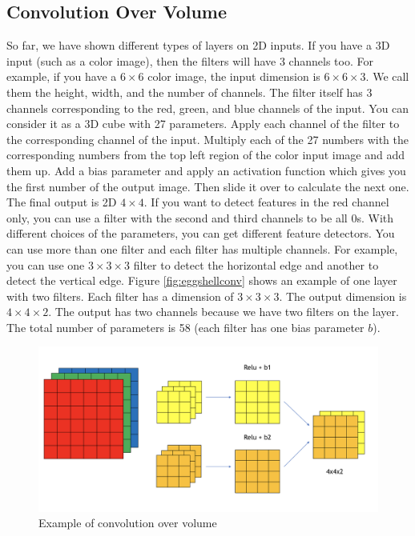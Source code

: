 \documentclass[12pt,]{krantz}
\begin{document}
\hypertarget{convolution-over-volume}{%
\subsection{Convolution Over Volume}\label{convolution-over-volume}}

So far, we have shown different types of layers on 2D inputs. If you have a 3D input (such as a color image), then the filters will have 3 channels too. For example, if you have a \(6 \times 6\) color image, the input dimension is \(6 \times 6 \times 3\). We call them the height, width, and the number of channels. The filter itself has 3 channels corresponding to the red, green, and blue channels of the input. You can consider it as a 3D cube with 27 parameters. Apply each channel of the filter to the corresponding channel of the input. Multiply each of the 27 numbers with the corresponding numbers from the top left region of the color input image and add them up. Add a bias parameter and apply an activation function which gives you the first number of the output image. Then slide it over to calculate the next one. The final output is 2D \(4 \times 4\). If you want to detect features in the red channel only, you can use a filter with the second and third channels to be all 0s. With different choices of the parameters, you can get different feature detectors. You can use more than one filter and each filter has multiple channels. For example, you can use one \(3 \times 3 \times 3\) filter to detect the horizontal edge and another to detect the vertical edge. Figure \ref{fig:eggshellconv} shows an example of one layer with two filters. Each filter has a dimension of \(3 \times 3 \times 3\). The output dimension is \(4 \times 4 \times 2\). The output has two channels because we have two filters on the layer. The total number of parameters is 58 (each filter has one bias parameter \(b\)).

\begin{figure}

{\centering \includegraphics[width=0.7\linewidth]{images/ConvOverVolume} 

}

\caption{Example of convolution over volume}\label{fig:ConvOverVolume}
\end{figure}
\end{document}
